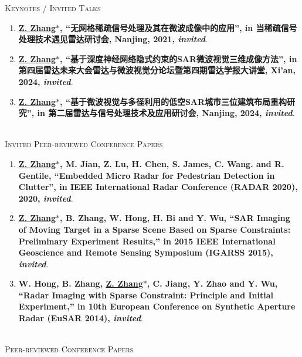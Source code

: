 \documentclass[paper=a4,fontsize=11pt]{scrartcl}
\begin{document}
\textsc{Keynotes / Invited Talks}

\begin{enumerate}

\item \textbf{\underline{Z. Zhang$\ast$}, ``无网格稀疏信号处理及其在微波成像中的应用'', in 当稀疏信号处理技术遇见雷达研讨会, Nanjing, 2021, \emph{invited}}.

\item \textbf{\underline{Z. Zhang$\ast$}, ``基于深度神经网络隐式约束的SAR微波视觉三维成像方法'', in 第四届雷达未来大会雷达与微波视觉分论坛暨第四期雷达学报大讲堂, Xi'an, 2024, \emph{invited}}.

\item \textbf{\underline{Z. Zhang$\ast$}, ``基于微波视觉与多径利用的低空SAR城市三位建筑布局重构研究'', in 第二届雷达与信号处理技术及应用研讨会, Nanjing, 2024, \emph{invited}}.

\end{enumerate}

~\\

\textsc{Invited Peer-reviewed Conference Papers}

\begin{enumerate}
	
\item \textbf{\underline{Z. Zhang$\ast$}, M. Jian, Z. Lu, H. Chen, S. James, C. Wang. and R. Gentile, ``Embedded Micro Radar for Pedestrian Detection in Clutter'', in IEEE International Radar Conference (RADAR 2020), 2020, \emph{invited}}.
   
\item \textbf{\underline{Z. Zhang$\ast$}, B. Zhang, W. Hong, H. Bi and Y. Wu, ``SAR Imaging of Moving Target in a Sparse Scene Based on Sparse Constraints: Preliminary Experiment Results,'' in 2015 IEEE International Geoscience and Remote Sensing Symposium (IGARSS 2015), \emph{invited}}.

\item \textbf{W. Hong, B. Zhang, \underline{Z. Zhang$\ast$}, C. Jiang, Y. Zhao and Y. Wu, ``Radar Imaging with Sparse Constraint: Principle and Initial Experiment,'' in 10th European Conference on Synthetic Aperture Radar (EuSAR 2014), \emph{invited}}.


\end{enumerate}

~\\

\textsc{Peer-reviewed Conference Papers}
\end{document}
